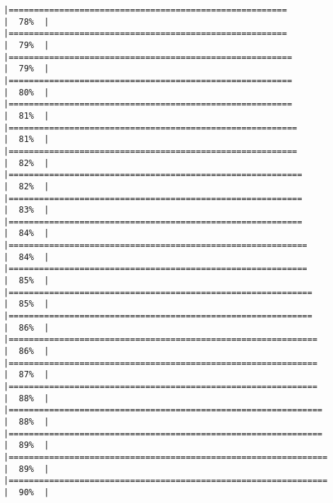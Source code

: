 \documentclass[
]{article}
\begin{document}
\begin{verbatim}
|=======================================================               |  78%  |                                                                              |=======================================================               |  79%  |                                                                              |========================================================              |  79%  |                                                                              |========================================================              |  80%  |                                                                              |========================================================              |  81%  |                                                                              |=========================================================             |  81%  |                                                                              |=========================================================             |  82%  |                                                                              |==========================================================            |  82%  |                                                                              |==========================================================            |  83%  |                                                                              |==========================================================            |  84%  |                                                                              |===========================================================           |  84%  |                                                                              |===========================================================           |  85%  |                                                                              |============================================================          |  85%  |                                                                              |============================================================          |  86%  |                                                                              |=============================================================         |  86%  |                                                                              |=============================================================         |  87%  |                                                                              |=============================================================         |  88%  |                                                                              |==============================================================        |  88%  |                                                                              |==============================================================        |  89%  |                                                                              |===============================================================       |  89%  |                                                                              |===============================================================       |  90%  |                                                                              
\end{verbatim}
\end{document}
